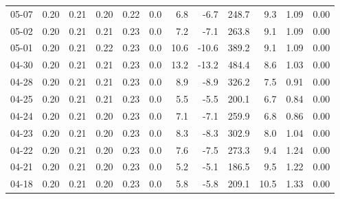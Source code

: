 \begin{threeparttable}
{\begin{tabular}{lrrrrrrrrrrr}
  05-07 &          0.20 &          0.21 &          0.20 &        0.22 &                 0.0 &                 6.8 &       -6.7 &               248.7 &              9.3 &            1.09 &                   0.00 \\
  05-02 &          0.20 &          0.21 &          0.21 &        0.23 &                 0.0 &                 7.2 &       -7.1 &               263.8 &              9.1 &            1.09 &                   0.00 \\
  05-01 &          0.20 &          0.21 &          0.22 &        0.23 &                 0.0 &                10.6 &      -10.6 &               389.2 &              9.1 &            1.09 &                   0.00 \\
  04-30 &          0.20 &          0.21 &          0.21 &        0.23 &                 0.0 &                13.2 &      -13.2 &               484.4 &              8.6 &            1.03 &                   0.00 \\
  04-28 &          0.20 &          0.21 &          0.21 &        0.23 &                 0.0 &                 8.9 &       -8.9 &               326.2 &              7.5 &            0.91 &                   0.00 \\
  04-25 &          0.20 &          0.21 &          0.21 &        0.23 &                 0.0 &                 5.5 &       -5.5 &               200.1 &              6.7 &            0.84 &                   0.00 \\
  04-24 &          0.20 &          0.21 &          0.20 &        0.23 &                 0.0 &                 7.1 &       -7.1 &               259.9 &              6.8 &            0.86 &                   0.00 \\
  04-23 &          0.20 &          0.21 &          0.20 &        0.23 &                 0.0 &                 8.3 &       -8.3 &               302.9 &              8.0 &            1.04 &                   0.00 \\
  04-22 &          0.20 &          0.21 &          0.20 &        0.23 &                 0.0 &                 7.6 &       -7.5 &               273.3 &              9.4 &            1.24 &                   0.00 \\
  04-21 &          0.20 &          0.21 &          0.20 &        0.23 &                 0.0 &                 5.2 &       -5.1 &               186.5 &              9.5 &            1.22 &                   0.00 \\
  04-18 &          0.20 &          0.21 &          0.20 &        0.23 &                 0.0 &                 5.8 &       -5.8 &               209.1 &             10.5 &            1.33 &                   0.00 \\

\end{tabular}}
\end{threeparttable}
